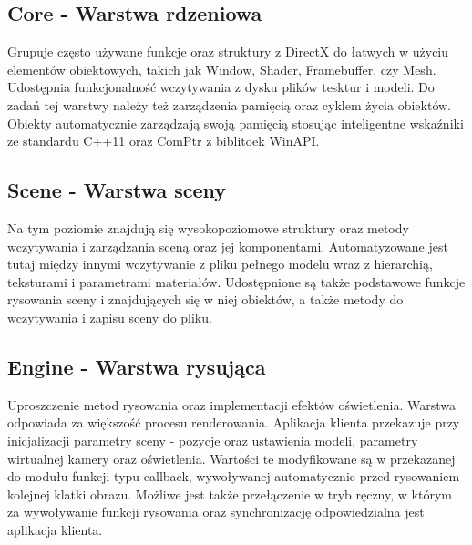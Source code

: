 \subsection{\textbf{Core} - Warstwa rdzeniowa}
Grupuje często używane funkcje oraz struktury z DirectX do łatwych w użyciu elementów obiektowych, takich jak Window, Shader, Framebuffer, czy Mesh.
Udostępnia funkcjonalność wczytywania z dysku plików tesktur i modeli.
Do zadań tej warstwy należy też zarządzenia pamięcią oraz cyklem życia obiektów.
Obiekty automatycznie zarządzają swoją pamięcią stosując inteligentne wskaźniki ze standardu C++11 oraz ComPtr z biblitoek WinAPI.

\subsection{\textbf{Scene} - Warstwa sceny}
Na tym poziomie znajdują się wysokopoziomowe struktury oraz metody wczytywania i zarządzania sceną oraz jej komponentami.
Automatyzowane jest tutaj między innymi wczytywanie z pliku pełnego modelu wraz z hierarchią, teksturami i parametrami materiałów.
Udostępnione są także podstawowe funkcje rysowania sceny i znajdujących się w niej obiektów, a także metody do wczytywania i zapisu sceny do pliku.

\subsection{\textbf{Engine} - Warstwa rysująca}
Uproszczenie metod rysowania oraz implementacji efektów oświetlenia.
Warstwa odpowiada za większość procesu renderowania.
Aplikacja klienta przekazuje przy inicjalizacji parametry sceny - pozycje oraz ustawienia modeli, parametry wirtualnej kamery oraz oświetlenia.
Wartości te modyfikowane są w przekazanej do modułu funkcji typu callback, wywoływanej automatycznie przed rysowaniem kolejnej klatki obrazu.
Możliwe jest także przełączenie w tryb ręczny, w którym za wywoływanie funkcji rysowania oraz synchronizację odpowiedzialna jest aplikacja klienta.